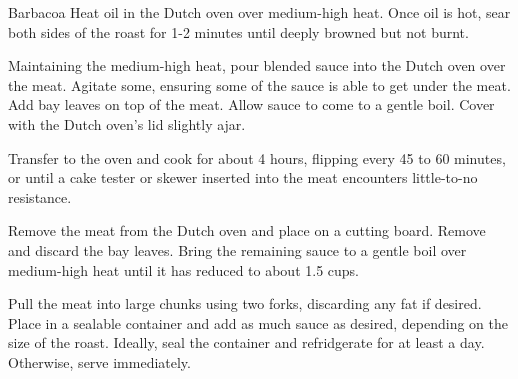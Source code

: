 \documentclass[]{article}
\begin{document}
\begin{recipe}{Barbacoa}{}{}
	Heat oil in the Dutch oven over medium-high heat. Once oil is hot, sear both sides of the roast for
	1-2 minutes until deeply browned but not burnt.
	
	Maintaining the medium-high heat, pour blended sauce into the Dutch oven over the meat. Agitate some, ensuring some of the sauce
	is able to get under the meat. Add bay leaves on top of the meat. Allow sauce to come to a gentle boil. Cover with the Dutch
	oven's lid slightly ajar.

	\newstep
	Transfer to the oven and cook for about 4 hours, flipping every 45 to 60 minutes, or until a cake tester or skewer inserted into
	the meat encounters little-to-no resistance. 
	
	\newstep
	Remove the meat from the Dutch oven and place on a cutting board. Remove and discard the bay leaves.
	Bring the remaining sauce to a gentle boil over medium-high heat until it has reduced to about 1.5 cups.

	\newstep
	Pull the meat into large chunks using two forks, discarding any fat if desired. Place in a sealable container and 
	add as much sauce as desired, depending on the size of the roast. Ideally, seal the container and
	refridgerate for at least a day. Otherwise, serve immediately.
	
\end{recipe}
\end{document}
